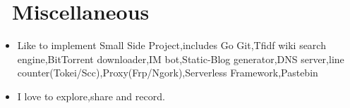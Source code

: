 \documentclass{resume}
\newcommand{\en}[1]{#1}
\newcommand{\zh}[1]{}
\begin{document}
\section{\faInfo\ \en{Miscellaneous}\zh{杂项}}
\begin{itemize}[parsep=0.5ex]
      \item \en{Like to implement Small Side Project,includes Go Git,Tfidf wiki search engine,BitTorrent downloader,IM bot,Static-Blog generator,DNS server,line counter(Tokei/Scc),Proxy(Frp/Ngork),Serverless Framework,Pastebin}
            \zh{喜欢实现 Small Side Project,包括 Go Git、Tfidf wiki 搜索引擎、BitTorrent downloader、IM bot、Static-Blog generator、line counter(Tokei/Scc)、Proxy(Frp/Ngork)、Serverless Framework、Pastebin 等等}
      \item \en{I love to explore,share and record.}
            \zh{喜欢折腾和探索,热爱分享和记录}
\end{itemize}
\end{document}
